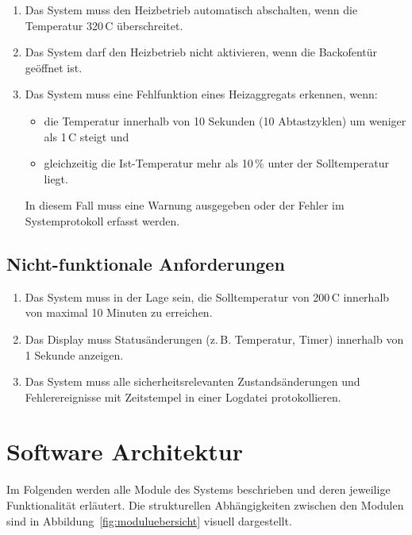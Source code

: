 \documentclass[a4paper,12pt]{article}
\begin{document}
\begin{enumerate}[label=\textbf{R-2.\arabic*}, ref=R-2.\arabic*, itemsep=0pt, topsep=0pt, font=\bfseries]
    \item \label{req:2.1} Das System muss den Heizbetrieb automatisch abschalten, wenn die Temperatur 320\,\textdegree{}C überschreitet.
    \item \label{req:2.2} Das System darf den Heizbetrieb nicht aktivieren, wenn die Backofentür geöffnet ist.
    \item \label{req:2.3} Das System muss eine Fehlfunktion eines Heizaggregats erkennen, wenn:
    \begin{itemize}
        \item die Temperatur innerhalb von 10 Sekunden (10 Abtastzyklen) um weniger als 1\,\textdegree{}C steigt und
        \item gleichzeitig die Ist-Temperatur mehr als 10\,\% unter der Solltemperatur liegt.
   \end{itemize}
    In diesem Fall muss eine Warnung ausgegeben oder der Fehler im Systemprotokoll erfasst werden.
\end{enumerate}

\subsection{Nicht-funktionale Anforderungen}

\begin{enumerate}[label=\textbf{R-3.\arabic*}, ref=R-3.\arabic*, itemsep=0pt, topsep=0pt, font=\bfseries]
    \item \label{req:3.1} Das System muss in der Lage sein, die Solltemperatur von 200\,\textdegree{}C innerhalb von maximal 10 Minuten zu erreichen.
    \item \label{req:3.2} Das Display muss Statusänderungen (z.\,B. Temperatur, Timer) innerhalb von 1 Sekunde anzeigen.
    \item \label{req:3.3} Das System muss alle sicherheitsrelevanten Zustandsänderungen und Fehlerereignisse mit Zeitstempel in einer Logdatei protokollieren.
\end{enumerate}

\newpage

\section{Software Architektur}

Im Folgenden werden alle Module des Systems beschrieben und deren jeweilige Funktionalität erläutert. Die strukturellen Abhängigkeiten zwischen den Modulen sind in Abbildung~\ref{fig:moduluebersicht} visuell dargestellt.
\end{document}
